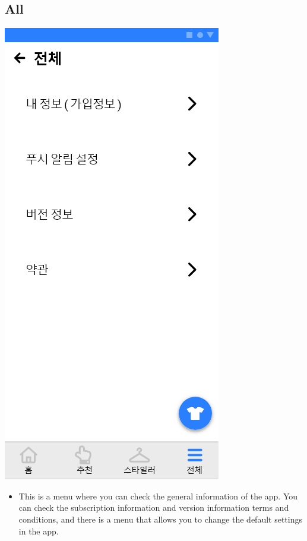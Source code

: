 \documentclass[conference]{IEEEtran}
\begin{document}
\subsection{All\\}
\centerline{\includegraphics[scale=0.30]{12. 전체.jpg}}
          \begin{itemize}
    \item[] This is a menu where you can check the general information of the app. You can check the subscription information and version information terms and conditions, and there is a menu that allows you to change the default settings in the app.
\end{itemize}




\end{document}
